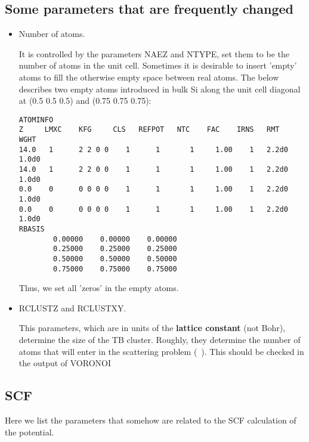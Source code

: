 \documentclass[11pt,fleqn]{book} %
\begin{document}
\subsection{Some parameters that are frequently changed}
\label{subsec:parameters}

\begin{itemize}

\item Number of atoms.

It is controlled by the parameters NAEZ and NTYPE, set them to be the number of atoms in the
unit cell. Sometimes it is desirable to insert 'empty' atoms to fill the otherwise empty
space between real atoms. The below describes two empty atoms introduced in bulk Si along
the unit cell diagonal at (0.5 0.5 0.5) and (0.75 0.75 0.75):
\begin{VBox}
{\small{
\begin{verbatim}
ATOMINFO
Z     LMXC    KFG     CLS   REFPOT   NTC    FAC    IRNS   RMT     WGHT
14.0   1      2 2 0 0    1      1       1     1.00    1   2.2d0   1.0d0
14.0   1      2 2 0 0    1      1       1     1.00    1   2.2d0   1.0d0
0.0    0      0 0 0 0    1      1       1     1.00    1   2.2d0   1.0d0
0.0    0      0 0 0 0    1      1       1     1.00    1   2.2d0   1.0d0
RBASIS
        0.00000    0.00000    0.00000
        0.25000    0.25000    0.25000
        0.50000    0.50000    0.50000
        0.75000    0.75000    0.75000
\end{verbatim}
}}
\end{VBox}

Thus, we set all 'zeros' in the empty atoms.

\item RCLUSTZ and RCLUSTXY.

This parameters, which are in units of the \textbf{lattice constant} (not Bohr),
determine the size of the TB cluster. Roughly, they determine the number of atoms
that will enter in the scattering problem (~). This should be checked
in the output of VORONOI
\end{itemize}

\subsection{SCF}

Here we list the parameters that somehow are related to the SCF calculation of the potential.
\end{document}
